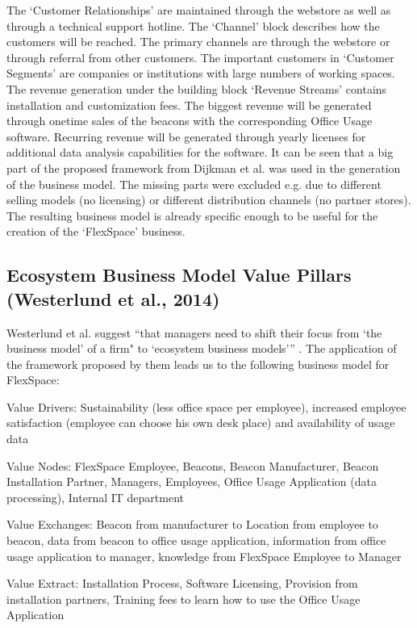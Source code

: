 	The `Customer Relationships' are maintained through the webstore as well as through a technical support hotline. The `Channel' block describes how the customers will be reached. The primary channels are through the webstore or through referral from other customers. The important customers in `Customer Segments' are companies or institutions with large numbers of working spaces. The revenue generation under the building block `Revenue Streams' contains installation and customization fees. The biggest revenue will be generated through onetime sales of the beacons with the corresponding Office Usage software. Recurring revenue will be generated through yearly licenses for additional data analysis capabilities for the software. It can be seen that a big part of the proposed framework from Dijkman et al. was used in the generation of the business model. The missing parts were excluded e.g. due to different selling models (no licensing) or different distribution channels (no partner stores). The resulting business model is already specific enough to be useful for the creation of the `FlexSpace' business. 

	\subsection{Ecosystem Business Model Value Pillars (Westerlund et al., 2014)}
		Westerlund et al. suggest ``that managers need to shift their focus from `the business model' of a firm" to `ecosystem business models''' \cite[p. 8]{westerlund}. The application of the framework proposed by them leads us to the following business model for FlexSpace:

		Value Drivers: Sustainability (less office space per employee), increased employee satisfaction (employee can choose his own desk place) and availability of usage data

		Value Nodes: FlexSpace Employee, Beacons, Beacon Manufacturer, Beacon Installation Partner, Managers, Employees, Office Usage Application (data processing), Internal IT department

		Value Exchanges: Beacon from manufacturer to Location from employee to beacon, data from beacon to office usage application, information from office usage application to manager, knowledge from FlexSpace Employee to Manager

		Value Extract: Installation Process, Software Licensing, Provision from installation partners, Training fees to learn how to use the Office Usage Application

